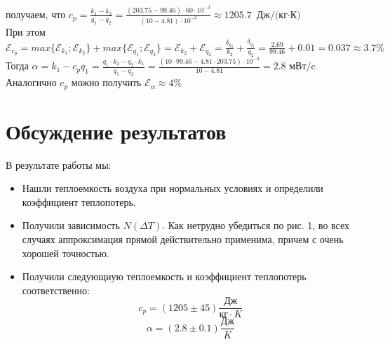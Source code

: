 \documentclass[a4paper, 10pt, twocolumn]{article}
\begin{document}
    получаем, что $c_p = \frac{k_1 - k_2}{q_1 - q_2} = \frac{(203.75 - 99.46) \cdot 60 \cdot 10^{-3}}{(10 - 4.81) \cdot 10^{-3}}
     \approx 1205.7 \text{ Дж/(кг$\cdot$К)}$ \\
    При этом $\mathcal{E}_{c_p} = max\{\mathcal{E}_{k_1}; \mathcal{E}_{k_2}\} + max\{\mathcal{E}_{q_1}; \mathcal{E}_{q_2}\}
     = \mathcal{E}_{k_2} + \mathcal{E}_{q_2} = \frac{\delta_{k_2}}{k_2} + \frac{\delta_{q_2}}{q_2} =
     \frac{2.69}{99.46} + 0.01 = 0.037 \approx 3.7\%$ \\
    Тогда $\alpha = k_1 - c_{p}q_1 = \frac{q_1 \cdot k_2 - q_2 \cdot k_1}{q_1 - q_2} =
     \frac{(10 \cdot 99.46 - 4.81 \cdot 203.75) \cdot 10^{-3}}{10-4.81} = 2.8 \text{ мВт/c}$ \\
    Аналогично $c_p$ можно получить $\mathcal{E}_\alpha \approx 4\%$
\section{Обсуждение результатов}
    В результате работы мы:
    \begin{itemize}
        \item Нашли теплоемкость воздуха при нормальных условиях и определили коэффициент теплопотерь.
    
        \item Получили зависимость $N(\Delta T)$. Как нетрудно убедиться по рис. 1,
        во всех случаях аппроксимация прямой действительно применима, причем с очень
        хорошей точностью.

        \item Получили следующиую теплоемкость и коэффициент теплопотерь соответственно:
        $$c_p = (1205 \pm 45)\frac{\text{Дж}}{\text{кг} \cdot K}$$
        $$\alpha = (2.8 \pm 0.1)\frac{\text{Дж}}{K}$$
    \end{itemize}
\end{document}
